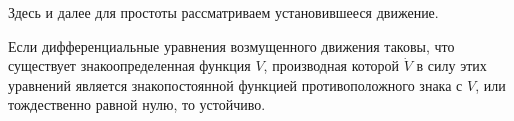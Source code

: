 

Здесь и далее для простоты рассматриваем установившееся движение.

\begin{to_thr}
    Если дифференциальные уравнения возмущенного движения таковы, что существует знакоопределенная функция $V$, производная которой $\dot{V}$ в силу этих уравнений является знакопостоянной функцией противоположного знака с $V$, или тождественно равной нулю, то  устойчиво.
\end{to_thr}









